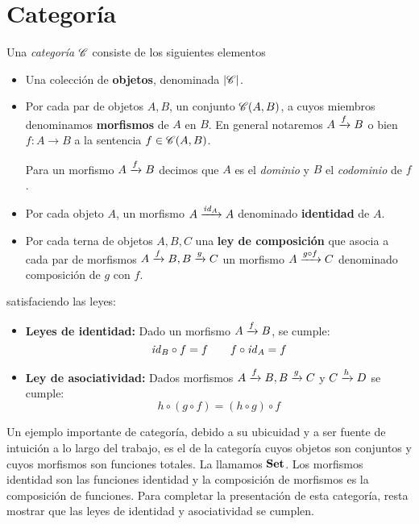 \section{Categoría}

\begin{definition} Una {\it categoría} $\mathscr{C}$ consiste de los siguientes elementos \label{def:cat}
  \begin{itemize}
  \item Una colección de {\bf objetos}, denominada $|\mathscr{C}|$.
  \item Por cada par de objetos $A, B$, un conjunto $\mathit{\mathscr{C}(}A,B\mathit{)}$, a cuyos miembros denominamos {\bf morfismos} de $A$ en $B$.
    En general notaremos $ A\xrightarrow{f}B$ o bien $f : A \to B$ a la sentencia $f \in \mathit{\mathscr{C}(}A,B\mathit{)}$.

    Para un morfismo $ A\xrightarrow{f}B$ decimos que $A$ es el {\it dominio} y $B$ el {\it codominio} de $f$.
  \item Por cada objeto $A$, un morfismo $ A\xrightarrow{\mathit{id}_{A}}A$ denominado {\bf identidad} de $A$.
  \item Por cada terna de objetos $A, B, C$ una {\bf ley de composición} que asocia a cada par de morfismos $ A\xrightarrow{f}B,  B\xrightarrow{g}C$ un morfismo $ A\xrightarrow{g\circ f}C$ denominado composición de $g$ con $f$.
  \end{itemize}
  satisfaciendo las leyes:
  \begin{itemize}\renewcommand{\labelitemi}{$\star$}
    \item {\bf Leyes de identidad:} Dado un morfismo $ A\xrightarrow{f}B$, se cumple: $$\mathit{id}_{B} \circ f = f \qquad f \circ \mathit{id}_{A} = f$$
    \item {\bf Ley de asociatividad:} Dados morfismos $ A\xrightarrow{f}B,  B\xrightarrow{g}C$ y $ C\xrightarrow{h}D$ se cumple:
    $$h \circ (g\circ f) = (h \circ g) \circ f$$
  \end{itemize}
  
\end{definition}

\hspace{1ex}
\begin{example} \label{ex:set}
Un ejemplo importante de categoría, debido a su ubicuidad y a ser fuente de intuición a lo largo del trabajo, es el de la categoría cuyos objetos son conjuntos y cuyos morfismos son funciones totales. La llamamos $\mathbf{Set}$. Los morfismos identidad son las funciones identidad y la composición de morfismos es la composición de funciones. Para completar la presentación de esta categoría, resta mostrar que las leyes de identidad y asociatividad se cumplen.
\end{example}

